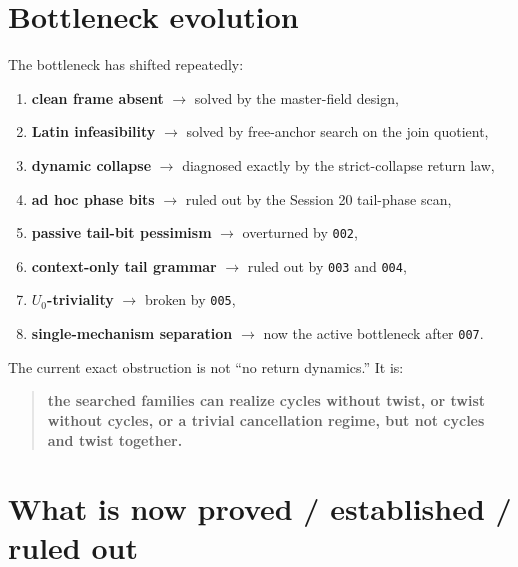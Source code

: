 \documentclass[11pt]{article}
\begin{document}
\section*{Bottleneck evolution}

The bottleneck has shifted repeatedly:
\begin{enumerate}
    \item \textbf{clean frame absent} $\to$ solved by the master-field design,
    \item \textbf{Latin infeasibility} $\to$ solved by free-anchor search on the join quotient,
    \item \textbf{dynamic collapse} $\to$ diagnosed exactly by the strict-collapse return law,
    \item \textbf{ad hoc phase bits} $\to$ ruled out by the Session 20 tail-phase scan,
    \item \textbf{passive tail-bit pessimism} $\to$ overturned by \texttt{002},
    \item \textbf{context-only tail grammar} $\to$ ruled out by \texttt{003} and \texttt{004},
    \item \textbf{$U_0$-triviality} $\to$ broken by \texttt{005},
    \item \textbf{single-mechanism separation} $\to$ now the active bottleneck after \texttt{007}.
\end{enumerate}

The current exact obstruction is not ``no return dynamics.'' It is:

\begin{quote}
\textbf{the searched families can realize cycles without twist, or twist without cycles, or a trivial cancellation regime, but not cycles and twist together.}
\end{quote}

\section*{What is now proved / established / ruled out}
\end{document}
